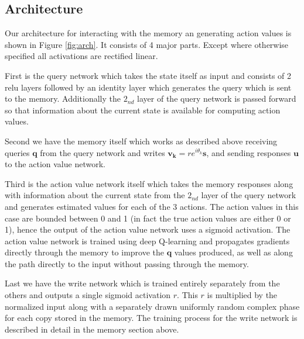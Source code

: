 \documentclass{article}
\begin{document}
\subsection*{Architecture}
Our architecture for interacting with the memory an generating action values is shown in Figure \ref{fig:arch}. It consists of 4 major parts. Except where otherwise specified all activations are rectified linear.

First is the query network which takes the state itself as input and consists of 2 relu layers followed by an identity layer which generates the query which is sent to the memory. Additionally the $2_{nd}$ layer of the query network is passed forward so that information about the current state is available for computing action values. 

Second we have the memory itself which works as described above receiving queries $\pmb{q}$ from the query network and writes $\pmb{v_k}=re^{i\theta_k}\pmb{s}$, and sending responses $\pmb{u}$ to the action value network.

Third is the action value network itself which takes the memory responses along with information about the current state from the $2_{nd}$ layer of the query network and generates estimated values for each of the 3 actions. The action values in this case are bounded between 0 and 1 (in fact the true action values are either 0 or 1), hence the output of the action value network uses a sigmoid activation. The action value network is trained using deep Q-learning and propagates gradients directly through the memory to improve the $\pmb{q}$ values produced, as well as along the path directly to the input without passing through the memory.

Last we have the write network which is trained entirely separately from the others and outputs a single sigmoid activation $r$. This $r$ is multiplied by the normalized input along with a separately drawn uniformly random complex phase for each copy stored in the memory. The training process for the write network is described in detail in the memory section above.
\end{document}
